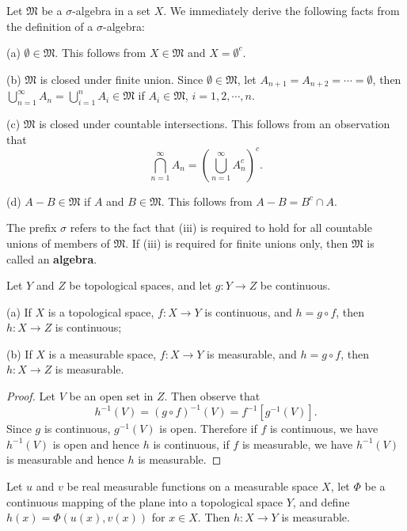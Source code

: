 Let $\mathfrak{M}$ be a $\sigma$-algebra in a set $X$. We immediately derive the following facts from the definition of a $\sigma$-algebra:\par
(a) $\emptyset\in\mathfrak{M}$. This follows from $X\in\mathfrak{M}$ and $X=\emptyset^c$.\par
(b) $\mathfrak{M}$ is closed under finite union. Since $\emptyset\in\mathfrak{M}$, let $A_{n+1}=A_{n+2}=\cdots=\emptyset$, then $\bigcup_{n=1}^\infty A_n=\bigcup_{i=1}^nA_i\in\mathfrak{M}$ if $A_i\in\mathfrak{M}$, $i=1,2,\cdots,n$.\par
(c) $\mathfrak{M}$ is closed under countable intersections. This follows from an observation that 
$$\bigcap_{n=1}^\infty A_n=\left(\bigcup_{n=1}^\infty A_n^c\right)^c.$$\par
(d) $A-B\in\mathfrak{M}$ if $A$ and $B\in\mathfrak{M}$. This follows from $A-B=B^c\cap A$.\par
The prefix $\sigma$ refers to the fact that (iii) is required to hold for all countable unions of members of $\mathfrak{M}$. If (iii) is required for finite unions only, then $\mathfrak{M}$ is called an \textbf{algebra}.
\begin{theorem}
Let $Y$ and $Z$ be topological spaces, and let $g:Y\to Z$ be continuous.\par
(a) If $X$ is a topological space, $f:X\to Y$ is continuous, and $h=g\circ f$, then $h:X\to Z$ is continuous;\par
(b)  If $X$ is a measurable space, $f:X\to Y$ is measurable, and $h=g\circ f$, then $h:X\to Z$ is measurable.
\end{theorem}
\begin{proof}
Let $V$ be an open set in $Z$. Then observe that 
$$h^{-1}\left( V \right) =\left( g\circ f \right) ^{-1}\left( V \right) =f^{-1}\left[ g^{-1}\left( V \right) \right] .$$
Since $g$ is continuous, $g^{-1}(V)$ is open. Therefore if $f$ is continuous, we have $h^{-1}(V)$ is open and hence $h$ is continuous, if $f$ is measurable, we have $h^{-1}(V)$ is measurable and hence $h$ is measurable.
\end{proof}
\begin{theorem}
Let $u$ and $v$ be real measurable functions on a measurable space $X$, let $\Phi$ be a continuous mapping of the plane into a topological space $Y$, and define $h(x)=\Phi(u(x),v(x))$ for $x\in X$. Then $h:X\to Y$ is measurable.
\end{theorem}
